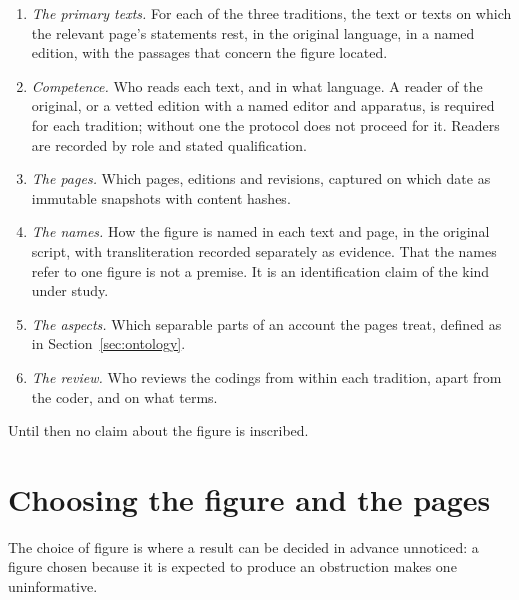\documentclass[11pt]{article}
\begin{document}
\begin{enumerate}[label=(\arabic*),nosep]
\item \emph{The primary texts.} For each of the three traditions, the text or texts on which the relevant page's statements rest, in the original language, in a named edition, with the passages that concern the figure located.
\item \emph{Competence.} Who reads each text, and in what language. A reader of the original, or a vetted edition with a named editor and apparatus, is required for each tradition; without one the protocol does not proceed for it. Readers are recorded by role and stated qualification.
\item \emph{The pages.} Which pages, editions and revisions, captured on which date as immutable snapshots with content hashes.
\item \emph{The names.} How the figure is named in each text and page, in the original script, with transliteration recorded separately as evidence. That the names refer to one figure is not a premise. It is an identification claim of the kind under study.
\item \emph{The aspects.} Which separable parts of an account the pages treat, defined as in Section~\ref{sec:ontology}.
\item \emph{The review.} Who reviews the codings from within each tradition, apart from the coder, and on what terms.
\end{enumerate}

Until then no claim about the figure is inscribed.

\section{Choosing the figure and the pages}\label{sec:choose}

The choice of figure is where a result can be decided in advance unnoticed: a figure chosen because it is expected to produce an obstruction makes one uninformative.
\end{document}
